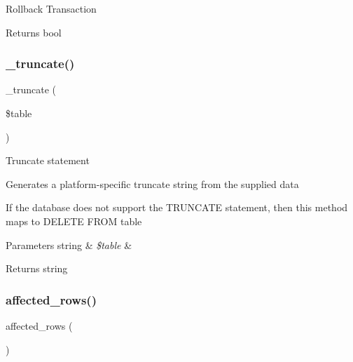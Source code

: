 Rollback Transaction

\begin{DoxyReturn}{Returns}
bool 
\end{DoxyReturn}
\mbox{\label{class_c_i___d_b__pdo__driver_aa029600528fc1ce660a23ff4b4667f95}} 
\subsubsection{\texorpdfstring{\+\_\+truncate()}{\_truncate()}}
{\footnotesize\ttfamily \+\_\+truncate (\begin{DoxyParamCaption}\item[{}]{\$table }\end{DoxyParamCaption})\hspace{0.3cm}{\ttfamily [protected]}}

Truncate statement

Generates a platform-\/specific truncate string from the supplied data

If the database does not support the T\+R\+U\+N\+C\+A\+TE statement, then this method maps to \textquotesingle{}D\+E\+L\+E\+TE F\+R\+OM table\textquotesingle{}


\begin{DoxyParams}[1]{Parameters}
string & {\em \$table} & \\
\hline
\end{DoxyParams}
\begin{DoxyReturn}{Returns}
string 
\end{DoxyReturn}
\mbox{\label{class_c_i___d_b__pdo__driver_a77248aaad33eb132c04cc4aa3f4bc8cb}} 
\subsubsection{\texorpdfstring{affected\+\_\+rows()}{affected\_rows()}}
{\footnotesize\ttfamily affected\+\_\+rows (\begin{DoxyParamCaption}{ }\end{DoxyParamCaption})}

